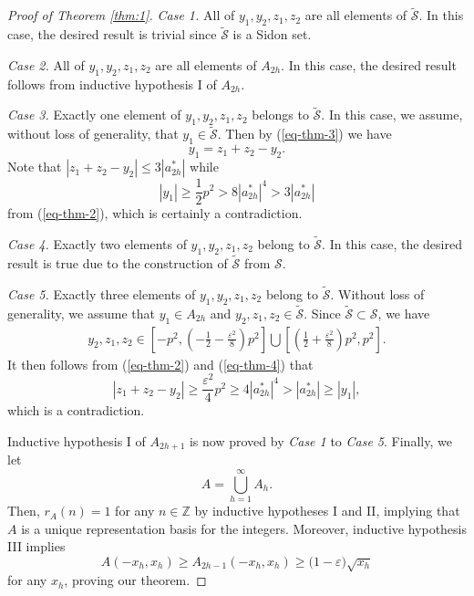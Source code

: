 \documentclass[12pt,a4paper,reqno]{amsart}
\numberwithin{equation}{section}
\theoremstyle{plain}
\theoremstyle{definition}
\begin{document}
\begin{proof}[Proof of Theorem \ref{thm:1}]
{\it Case 1.} All of $y_1, y_2, z_1, z_2$ are all elements of $\widetilde{\mathscr{S}}$. In this case, the desired result is trivial since $\widetilde{\mathscr{S}}$ is a Sidon set.

{\it Case 2.} All of $y_1, y_2, z_1, z_2$ are all elements of $A_{2h}$. In this case, the desired result follows from inductive hypothesis I of $A_{2h}$.

{\it Case 3.} Exactly one element of $y_1, y_2, z_1, z_2$ belongs to $\widetilde{\mathscr{S}}$. In this case, we assume, without loss of generality, that $y_1\in \widetilde{\mathscr{S}}$. Then by (\ref{eq-thm-3}) we have
$$
y_1=z_1+z_2-y_2.
$$
Note that 
$|z_1+z_2-y_2|\le 3|a^*_{2h}|$ while 
$$
|y_1|\ge \frac{1}{2}p^2> 8|a^*_{2h}|^4>3|a^*_{2h}|
$$
from (\ref{eq-thm-2}), which is certainly a contradiction.

{\it Case 4.} Exactly two elements of $y_1, y_2, z_1, z_2$ belong to $\widetilde{\mathscr{S}}$. In this case, the desired result is true due to the construction of $\widetilde{\mathscr{S}}$ from $\mathscr{S}$.

{\it Case 5.} Exactly three elements of $y_1, y_2, z_1, z_2$ belong to $\widetilde{\mathscr{S}}$. Without loss of generality, we assume that $y_1\in A_{2h}$ and $y_2, z_1, z_2\in \widetilde{\mathscr{S}}$. Since $\widetilde{\mathscr{S}}\subset \mathscr{S}$, we have
\begin{align}\label{eq-thm-4}
y_2, z_1, z_2\in \left[-p^2,\left(-\frac{1}{2}-\frac{\varepsilon^2}{8}\right)p^2\right]\bigcup \left[\left(\frac{1}{2}+\frac{\varepsilon^2}{8}\right)p^2, p^2\right].
\end{align}
It then follows from (\ref{eq-thm-2}) and (\ref{eq-thm-4}) that
$$
|z_1+z_2-y_2|\ge \frac{\varepsilon^2}{4}p^2\ge 4|a^*_{2h}|^4>|a^*_{2h}|\ge |y_1|,
$$
which is a contradiction.

Inductive hypothesis I of $A_{2h+1}$ is now proved by {\it Case 1} to {\it Case 5}. 
Finally, we let
$$
A=\bigcup_{h=1}^{\infty}A_h.
$$
Then, $r_A(n)=1$ for any $n\in \mathbb{Z}$ by inductive hypotheses I and II, implying that $A$ is a unique representation basis for the integers. Moreover, inductive hypothesis III implies
$$
A(-x_h,x_h)\ge A_{2h-1}(-x_h,x_h)\ge \big(1-\varepsilon\big)\sqrt{x_h}
$$
for any $x_h$, proving our theorem.
\end{proof}
\end{document}
